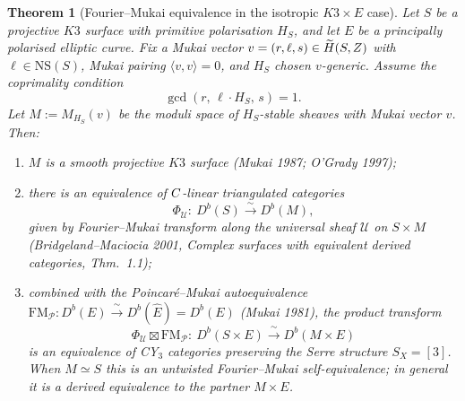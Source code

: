 \documentclass[12pt]{amsart}
\newtheorem{thm}{Theorem}[section]
\theoremstyle{remark}
\begin{document}
\begin{thm}[Fourier--Mukai equivalence in the isotropic \(K3\times E\) case]
  \label{thm:fm-self-duality-k3e}
  Let $S$ be a projective $K3$ surface with primitive polarisation
  $H_S$, and let $E$ be a principally polarised elliptic curve. Fix a
  Mukai vector $v = (r, \ell, s) \in \widetilde{H}(S, Z)$ with $\ell
  \in \mathrm{NS}(S)$, Mukai pairing \(\langle v,v\rangle=0\), and
  $H_S$ chosen $v$-generic. Assume the coprimality condition
  \begin{equation}\label{eq:coprimality-star}
    \gcd(r,\, \ell \cdot H_S,\, s) = 1. \tag{$\star$}
  \end{equation}
  Let $M := M_{H_S}(v)$ be the moduli space of $H_S$-stable sheaves
  with Mukai vector $v$. Then:
  \begin{enumerate}
    \item $M$ is a smooth projective $K3$ surface (Mukai 1987;
      O'Grady 1997);
    \item there is an equivalence of $C$-linear triangulated
      categories
      $$\Phi_{\mathcal{U}} :\ D^b(S) \xrightarrow{\,\sim\,} D^b(M),$$
      given by Fourier--Mukai transform along the universal sheaf
      $\mathcal{U}$ on $S \times M$ (Bridgeland--Maciocia 2001,
      \emph{Complex surfaces with equivalent derived categories},
      Thm.\ 1.1);
    \item combined with the Poincar\'e--Mukai autoequivalence
      $\mathrm{FM}_{\mathcal{P}} : D^b(E) \xrightarrow{\,\sim\,}
      D^b(\hat{E}) = D^b(E)$ (Mukai 1981), the product transform
      $$\Phi_{\mathcal{U}} \boxtimes \mathrm{FM}_{\mathcal{P}} :\
        D^b(S \times E) \xrightarrow{\,\sim\,}
        D^b(M \times E)$$
      is an equivalence of CY$_3$ categories preserving the Serre
      structure $S_{X} = [3]$.  When \(M\simeq S\) this is an
      untwisted Fourier--Mukai self-equivalence; in general it is a
      derived equivalence to the partner \(M\times E\).
  \end{enumerate}
\end{thm}
\end{document}
